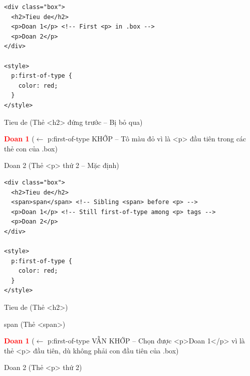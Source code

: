 \begin{codeWindow}
\begin{lstlisting}[language=HTML5]
<div class="box">
  <h2>Tieu de</h2>
  <p>Doan 1</p> <!-- First <p> in .box -->
  <p>Doan 2</p>
</div>

<style>
  p:first-of-type {
    color: red;
  }
</style>
\end{lstlisting}
\end{codeWindow}

\begin{browserWindow}
\sffamily\small
Tieu de {\scriptsize\textcolor{gray!60}{(Thẻ <h2> đứng trước -- Bị bỏ qua)}} \par\vspace{2pt}
\textcolor{red}{\textbf{Doan 1}} {\scriptsize\textcolor{gray!60}{($\leftarrow$ p:first-of-type KHỚP -- Tô màu đỏ vì là <p> đầu tiên trong các thẻ con của .box)}} \par\vspace{2pt}
Doan 2 {\scriptsize\textcolor{gray!60}{(Thẻ <p> thứ 2 -- Mặc định)}}
\end{browserWindow}

\begin{codeWindow}
\begin{lstlisting}[language=HTML5]
<div class="box">
  <h2>Tieu de</h2>
  <span>span</span> <!-- Sibling <span> before <p> -->
  <p>Doan 1</p> <!-- Still first-of-type among <p> tags -->
  <p>Doan 2</p>
</div>

<style>
  p:first-of-type {
    color: red;
  }
</style>
\end{lstlisting}
\end{codeWindow}

\begin{browserWindow}
\sffamily\small
Tieu de {\scriptsize\textcolor{gray!60}{(Thẻ <h2>)}} \par\vspace{2pt}
span {\scriptsize\textcolor{gray!60}{(Thẻ <span>)}} \par\vspace{2pt}
\textcolor{red}{\textbf{Doan 1}} {\scriptsize\textcolor{gray!60}{($\leftarrow$ p:first-of-type VẪN KHỚP -- Chọn được <p>Doan 1</p> vì là thẻ <p> đầu tiên, dù không phải con đầu tiên của .box)}} \par\vspace{2pt}
Doan 2 {\scriptsize\textcolor{gray!60}{(Thẻ <p> thứ 2)}}
\end{browserWindow}


